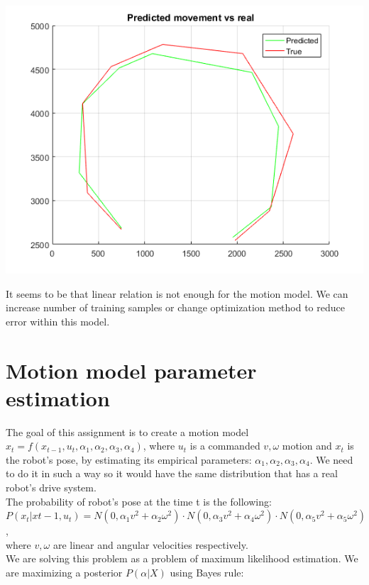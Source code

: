 \documentclass[a4paper, 12pt]{article}
\begin{document}
\includegraphics[scale = 1]{step2error.png}

It seems to be that linear relation is not enough for the motion model. We can increase number of training samples or change optimization method to reduce error within this model.


\section{Motion model parameter estimation}

The goal of this assignment is to create a motion model $x_t= f (x_{t-1} ,u_t ,\alpha_1, \alpha_2, \alpha_3, \alpha_4)$, where $u_t$ is a commanded $v, \omega$ motion and $x_t$ is the robot's pose,  by estimating its empirical parameters: $\alpha_1, \alpha_2, \alpha_3, \alpha_4$. We need to do it in such a way so it would have the same distribution that has a real robot's drive system.\\

The probability of robot's pose at the time t is the following:\\

$P(x_t |x{t-1}, u_t) = N(0, \alpha_1 v^2 + \alpha_2\omega^2) \cdot N (0, \alpha_3 v^2 + \alpha_4\omega^2)\cdot N (0, \alpha_5 v^2 + \alpha_5\omega^2)$,\\
where $v,\omega$ are linear and angular velocities respectively.\\

We are solving this problem as a problem of maximum likelihood estimation. We are maximizing a posterior $P(\alpha|X)$ using Bayes rule:\\
\end{document}
